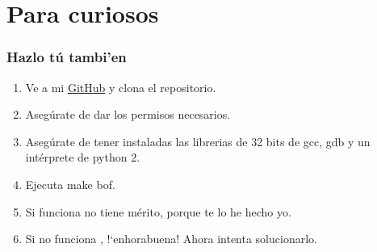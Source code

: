 \documentclass{beamer}
\begin{document}
\section{Para curiosos}

\begin{frame}
\frametitle{Hazlo t\'u tambi'en}
\begin{enumerate}
	\item Ve a mi \href{https://github.com/jmtorrespalma/}{GitHub} y clona el repositorio.
	\item Aseg\'urate de dar los permisos necesarios.
	\item Aseg\'urate de tener instaladas las librerias de 32 bits de gcc, gdb y un int\'erprete de python 2.
	\item Ejecuta make bof.
	\item Si funciona no tiene m\'erito, porque te lo he hecho yo.
	\item Si no funciona , !`enhorabuena! Ahora intenta solucionarlo.
\end{enumerate}
\end{frame}
\end{document}
